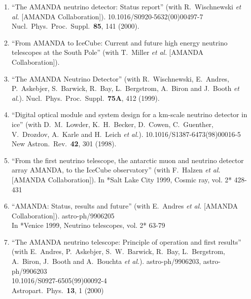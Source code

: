 \begin{enumerate}
\item ``The AMANDA neutrino detector: Status report'' (with R.~Wischnewski {\it et al.}  [AMANDA Collaboration]). 10.1016/S0920-5632(00)00497-7
\\{}Nucl.\ Phys.\ Proc.\ Suppl.\  {\bf 85}, 141 (2000). %


\item ``From AMANDA to IceCube: Current and future high energy neutrino telescopes at the South Pole'' (with T.~Miller {\it et al.}  [AMANDA Collaboration]).
  


\item ``The AMANDA Neutrino Detector'' (with R.~Wischnewski, E.~Andres, P.~Askebjer, S.~Barwick, R.~Bay, L.~Bergstrom, A.~Biron and J.~Booth {\it et al.}). Nucl.\ Phys.\ Proc.\ Suppl.\  {\bf 75A}, 412 (1999). %


\item ``Digital optical module and system design for a km-scale neutrino detector in ice'' (with D.~M.~Lowder, K.~H.~Becker, D.~Cowen, C.~Guenther, V.~Drozdov, A.~Karle and H.~Leich {\it et al.}). 10.1016/S1387-6473(98)00016-5
\\{}New Astron.\ Rev.\  {\bf 42}, 301 (1998). %


\item ``From the first neutrino telescope, the antarctic muon and neutrino detector array AMANDA, to the IceCube observatory'' (with F.~Halzen {\it et al.}  [AMANDA Collaboration]). In *Salt Lake City 1999, Cosmic ray, vol. 2* 428-431 %


\item ``AMANDA: Status, results and future'' (with E.~Andres {\it et al.}  [AMANDA Collaboration]). astro-ph/9906205
  \\{}In *Venice 1999, Neutrino telescopes, vol. 2* 63-79 %


\item ``The AMANDA neutrino telescope: Principle of operation and first results'' (with E.~Andres, P.~Askebjer, S.~W.~Barwick, R.~Bay, L.~Bergstrom, A.~Biron, J.~Booth and A.~Bouchta {\it et al.}). astro-ph/9906203, astro-ph/9906203
    \\{}10.1016/S0927-6505(99)00092-4
\\{}Astropart.\ Phys.\  {\bf 13}, 1 (2000) %



\end{enumerate}
